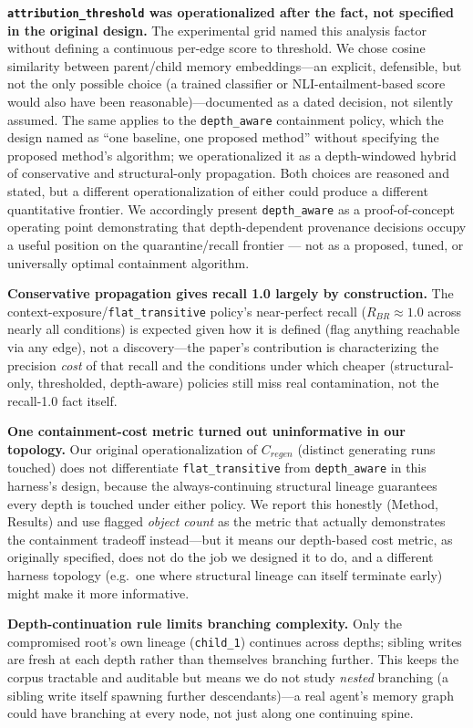 \textbf{\texttt{attribution\_threshold} was operationalized after the
fact, not specified in the original design.} The experimental grid
named this analysis factor without defining a continuous per-edge score
to threshold. We chose cosine similarity between parent/child memory
embeddings---an explicit, defensible, but not the only possible choice
(a trained classifier or NLI-entailment-based score would also have
been reasonable)---documented as a dated decision, not silently
assumed. The same applies to the \texttt{depth\_aware} containment
policy, which the design named as ``one baseline, one proposed method''
without specifying the proposed method's algorithm; we operationalized
it as a depth-windowed hybrid of conservative and structural-only
propagation. Both choices are reasoned and stated, but a different
operationalization of either could produce a different quantitative
frontier. We accordingly present \texttt{depth\_aware} as a
proof-of-concept operating point demonstrating that depth-dependent
provenance decisions occupy a useful position on the quarantine/recall
frontier --- not as a proposed, tuned, or universally optimal
containment algorithm.

\textbf{Conservative propagation gives recall 1.0 largely by
construction.} The context-exposure/\texttt{flat\_transitive} policy's
near-perfect recall ($R_{BR} \approx 1.0$ across nearly all conditions)
is expected given how it is defined (flag anything reachable via any
edge), not a discovery---the paper's contribution is characterizing the
precision \emph{cost} of that recall and the conditions under which
cheaper (structural-only, thresholded, depth-aware) policies still miss
real contamination, not the recall-1.0 fact itself.

\textbf{One containment-cost metric turned out uninformative in our
topology.} Our original operationalization of $C_{regen}$ (distinct
generating runs touched) does not differentiate \texttt{flat\_transitive}
from \texttt{depth\_aware} in this harness's design, because the
always-continuing structural lineage guarantees every depth is touched
under either policy. We report this honestly (Method, Results) and use
flagged \emph{object count} as the metric that actually demonstrates
the containment tradeoff instead---but it means our depth-based cost
metric, as originally specified, does not do the job we designed it to
do, and a different harness topology (e.g.\ one where structural
lineage can itself terminate early) might make it more informative.

\textbf{Depth-continuation rule limits branching complexity.} Only the
compromised root's own lineage (\texttt{child\_1}) continues across
depths; sibling writes are fresh at each depth rather than themselves
branching further. This keeps the corpus tractable and auditable but
means we do not study \emph{nested} branching (a sibling write itself
spawning further descendants)---a real agent's memory graph could have
branching at every node, not just along one continuing spine.

